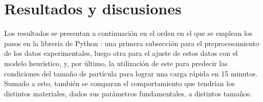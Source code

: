 \section{Resultados y discusiones}

Los resultados se presentan a continuación en el orden en el que se emplean 
los pasos en la librería de Python : una primera subsección
para el preprocesamiento de los datos experimentales, luego otra para el ajuste
de estos datos con el modelo heurístico, y, por último, la utilización de este
para predecir las condiciones del tamaño de partícula para lograr una carga
rápida en 15 minutos. Sumado a esto, también se comparan el comportamiento que
tendrían los distintos materiales, dados sus parámetros fundamentales, a 
distintos tamaños.








